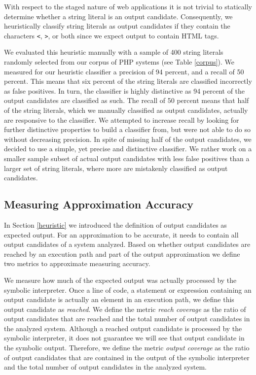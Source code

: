 \documentclass[sigconf, preprint]{acmart}
\renewcommand{\tt}[1]{\texttt{#1}}
\begin{document}
With respect to the staged nature of web applications it is
not trivial to statically determine whether a string literal is an output
candidate. Consequently, we heuristically classify string literals as output
candidates if they contain the characters \tt{<}, \tt{>}, or both since we expect output to
contain HTML tags.

We evaluated this heuristic manually with a sample of 400 string
literals randomly selected from our corpus of PHP systems (see Table
\ref{corpus}). We measured for our heuristic classifier a precision of 94 percent, and a
recall of 50 percent. This means that six percent of the string literals are
classified incorrectly as false positives. In turn, the classifier is highly
distinctive as 94 percent of the output candidates are classified as such. The
recall of 50 percent means that half of the string literals, which we manually 
classified as output candidates, actually are responsive to the classifier. We
attempted to increase recall by looking for further distinctive properties to build a
classifier from, but were not able to do so without decreasing precision. 
In spite of missing half of the output candidates, we decided
to use a simple, yet precise and distinctive classifier. We rather work on a
smaller sample subset of actual output candidates with less false positives
than a larger set of string literals, where more are mistakenly classified as
output candidates.

\subsection{Measuring Approximation Accuracy}
\label{HowAccurateIsOurApproximation} 
In Section \ref{heuristic} we introduced the definition of output candidates as
expected output. For an approximation to be accurate, it needs to contain
all output candidates of a system analyzed. Based on whether output
candidates are reached by an execution path and part of the output
approximation we define two metrics to approximate measuring accuracy.

We measure how much of the expected output was actually processed by the
symbolic interpreter. Once a line of code, a statement or expression
containing an output candidate is actually an element in an execution path, we
define this output candidate as \emph{reached}. We define the metric \emph{reach
coverage} as the ratio of output candidates that are reached and the total
number of output candidates in the analyzed system. Although a reached output
candidate is processed by the symbolic interpreter, it does not guarantee we
will see that output candidate in the symbolic output. Therefore, we define the
metric \emph{output coverage} as the ratio of output candidates that are
contained in the output of the symbolic interpreter and the total number of
output candidates in the analyzed system.  
\end{document}
